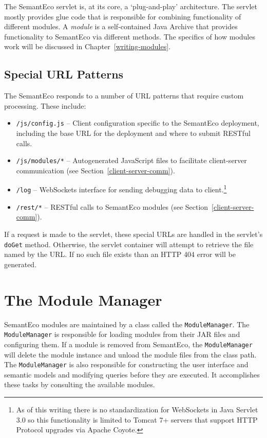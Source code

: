 \documentclass[letterpaper]{report}
\begin{document}
The SemantEco servlet is, at its core, a `plug-and-play' architecture. The servlet mostly provides glue code that is responsible for combining functionality of different modules. A \textit{module} is a self-contained Java Archive that provides functionality to SemantEco via different methods. The specifics of how modules work will be discussed in Chapter~\ref{writing-modules}.

\subsection{Special URL Patterns}
\label{url-patterns}
The SemantEco responds to a number of URL patterns that require custom processing. These include:
\begin{itemize}
\item \texttt{/js/config.js} -- Client configuration specific to the SemantEco deployment, including the base URL for the deployment and where to submit RESTful calls.
\item \texttt{/js/modules/*} -- Autogenerated JavaScript files to facilitate client-server communication (see Section~\ref{client-server-comm}).
\item \texttt{/log} -- WebSockets interface for sending debugging data to client.\footnote{As of this writing there is no standardization for WebSockets in Java Servlet 3.0 so this functionality is limited to Tomcat 7+ servers that support HTTP Protocol upgrades via Apache Coyote.}
\item \texttt{/rest/*} -- RESTful calls to SemantEco modules (see Section~\ref{client-server-comm}).
\end{itemize}

\noindent If a request is made to the servlet, these special URLs are handled in the servlet's \texttt{doGet} method. Otherwise, the servlet container will attempt to retrieve the file named by the URL. If no such file exists than an HTTP 404 error will be generated.

\section{The Module Manager}
\label{module-manager}
SemantEco modules are maintained by a class called the \texttt{ModuleManager}. The \texttt{ModuleManager} is responsible for loading modules from their JAR files and configuring them. If a module is removed from SemantEco, the \texttt{ModuleManager} will delete the module instance and unload the module files from the class path. The \texttt{ModuleManager} is also responsible for constructing the user interface and semantic models and modifying queries before they are executed. It accomplishes these tasks by consulting the available modules.
\end{document}
